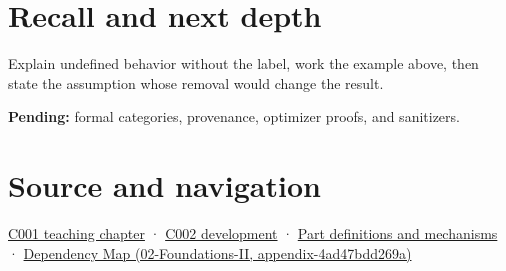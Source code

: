 \section{Recall and next depth}\label{appendix-f558f5b4d8f2-recall-and-next-depth}

Explain undefined behavior without the label, work the example above, then state the assumption whose removal would change the result.

\textbf{Pending:} formal categories, provenance, optimizer proofs, and sanitizers.

\section{Source and navigation}\label{appendix-f558f5b4d8f2-source-and-navigation}

\href{Continuous\%20Notes/Computing\%20Foundations\%20-\%20From\%20Bits\%20to\%20C++\%20and\%20Systems\%20APIs\#From\%20a\%20signal\%20to\%20an\%20interpretation}{C001 teaching chapter} · \href{Continuous\%20Notes/Computing\%20Foundations\%20-\%20From\%20Bits\%20to\%20C++\%20and\%20Systems\%20APIs\#Arithmetic\%20becomes\%20a\%20policy}{C002 development} · \hyperref[appendix-fd090d982a15]{Part definitions and mechanisms} · \href{../02-Foundations-II/main.pdf\#nameddest=appendix-4ad47bdd269a}{Dependency Map (02-Foundations-II, appendix-4ad47bdd269a)}
